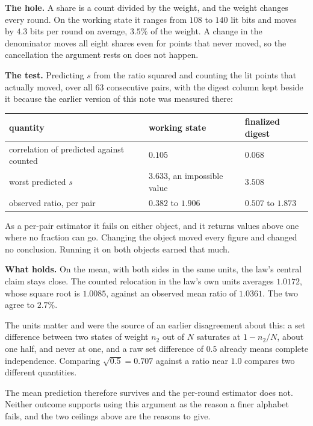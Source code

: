 \textbf{The hole.} A share is a count divided by the weight, and the weight changes every round. On the working state it ranges from \(108\) to \(140\) lit bits and moves by \(4.3\) bits per round on average, \(3.5\%\) of the weight. A change in the denominator moves all eight shares even for points that never moved, so the cancellation the argument rests on does not happen.

\textbf{The test.} Predicting \(s\) from the ratio squared and counting the lit points that actually moved, over all \(63\) consecutive pairs, with the digest column kept beside it because the earlier version of this note was measured there:

\begin{center}
\begin{tabular}{@{}lll@{}}
\toprule
quantity & working state & finalized digest \\
\midrule
correlation of predicted against counted & \(0.105\) & \(0.068\) \\
worst predicted \(s\) & \(3.633\), an impossible value & \(3.508\) \\
observed ratio, per pair & \(0.382\) to \(1.906\) & \(0.507\) to \(1.873\) \\
\bottomrule
\end{tabular}
\end{center}

As a per-pair estimator it fails on either object, and it returns values above one where no fraction can go. Changing the object moved every figure and changed no conclusion. Running it on both objects earned that much.

\textbf{What holds.} On the mean, with both sides in the same units, the law's central claim stays close. The counted relocation in the law's own units averages \(1.0172\), whose square root is \(1.0085\), against an observed mean ratio of \(1.0361\). The two agree to \(2.7\%\).

The units matter and were the source of an earlier disagreement about this: a set difference between two states of weight \(n_2\) out of \(N\) saturates at \(1 - n_2/N\), about one half, and never at one, and a raw set difference of \(0.5\) already means complete independence. Comparing \(\sqrt{0.5} = 0.707\) against a ratio near \(1.0\) compares two different quantities.

The mean prediction therefore survives and the per-round estimator does not. Neither outcome supports using this argument as the reason a finer alphabet fails, and the two ceilings above are the reasons to give.

